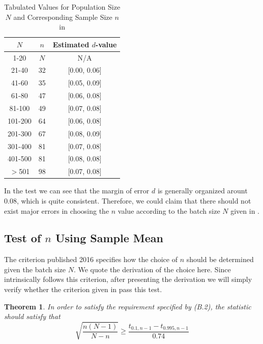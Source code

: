 \documentclass[12pt]{article}
\newtheorem{theorem}{Theorem}[section]
\begin{document}
\begin{table}[htbp]
    \centering
    \begin{tabular}{ccc}
        \toprule
        $N$ & $n$ & Estimated $d$-value \\
        \midrule
        1-20 & $N$ & N/A \\
        21-40 & 32 & [0.00, 0.06] \\
        41-60 & 35 & [0.05, 0.09] \\
        61-80 & 47 & [0.06, 0.08]\\ 
        81-100 & 49 & [0.07, 0.08]\\ 
        101-200 & 64 & [0.06, 0.08]\\ 
        201-300 & 67 & [0.08, 0.09]\\ 
        301-400 & 81 & [0.07, 0.08]\\ 
        401-500 & 81 & [0.08, 0.08]\\ 
        $>$501 & 98 & [0.07, 0.08] \\
        \bottomrule
    \end{tabular}
    \caption{Tabulated Values for Population Size $N$ and Corresponding Sample Size $n$ in \cite{OIML2016}}
\end{table}

In the test we can see that the margin of error $d$ is generally organized arount 0.08, which is quite consistent. Therefore, we could claim that there should not exist major errors in choosing the $n$ value according to the batch size $N$ given in \cite{OIML2016}. 

\subsection{Test of $n$ Using Sample Mean}

The criterion published 2016 \cite{OIML2016} specifies how the choice of $n$ should be determined given the batch size $N$. We quote the derivation of the choice here. Since \cite{OIML2016} intrinsically follows this criterion, after presenting the derivation we will simply verify whether the criterion given in \cite{JJF2005} pass this test. 

\begin{theorem}
    In order to satisfy the requirement specified by (B.2), the statistic should satisfy that
    \begin{equation}\label{samplemean}
        \sqrt{\dfrac{n(N-1)}{N-n}} \geq \dfrac{t_{0.1,n-1} - t_{0.995,n-1}}{0.74}
    \end{equation}
\end{theorem}
\end{document}
